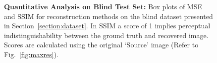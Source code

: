 \begin{figure}[t!]
	\centering
	\caption{\footnotesize{ {\bf Quantitative Analysis on Blind Test Set:}  Box plots of MSE and SSIM for reconstruction methods on the blind dataset presented in Section~\ref{section:dataset}. 
			In SSIM a score of 1 implies perceptual indistinguishability between the ground truth and recovered image. Scores are calculated using the original `Source' image (Refer to Fig.~\ref{fig:maxres}). 
		}}
	\label{fig:resultnums}
\end{figure}


